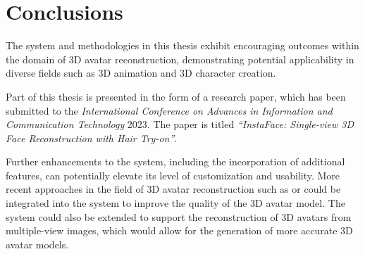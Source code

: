 \section{Conclusions}\label{sec:conclusions}

The system and methodologies in this thesis exhibit encouraging outcomes within the domain of 3D avatar reconstruction, demonstrating potential applicability in diverse fields such as 3D animation and 3D character creation.

Part of this thesis is presented in the form of a research paper, which has been submitted to the \textit{International Conference on Advances in Information and Communication Technology} 2023. The paper is titled \textit{``InstaFace: Single-view 3D Face Reconstruction with Hair Try-on''}. 

Further enhancements to the system, including the incorporation of additional features, can potentially elevate its level of customization and usability. More recent approaches in the field of 3D avatar reconstruction such as  or  could be integrated into the system to improve the quality of the 3D avatar model. The system could also be extended to support the reconstruction of 3D avatars from multiple-view images, which would allow for the generation of more accurate 3D avatar models.